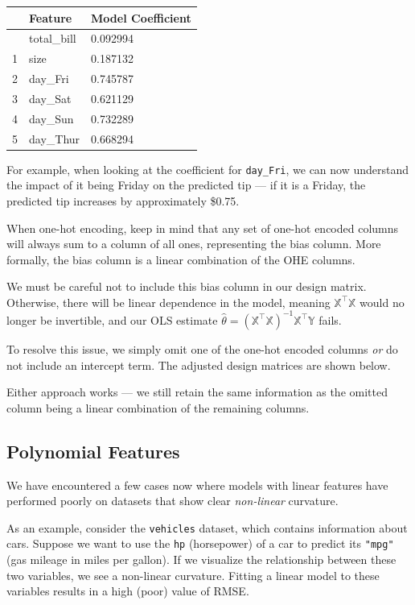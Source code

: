 \documentclass[
  letterpaper,
  DIV=11,
  numbers=noendperiod]{scrreprt}
\begin{document}
\begin{longtable}[]{@{}lll@{}}
\toprule\noalign{}
& Feature & Model Coefficient \\
\midrule\noalign{}
\endhead
\bottomrule\noalign{}
\endlastfoot
0 & total\_bill & 0.092994 \\
1 & size & 0.187132 \\
2 & day\_Fri & 0.745787 \\
3 & day\_Sat & 0.621129 \\
4 & day\_Sun & 0.732289 \\
5 & day\_Thur & 0.668294 \\
\end{longtable}

For example, when looking at the coefficient for \texttt{day\_Fri}, we
can now understand the impact of it being Friday on the predicted tip
--- if it is a Friday, the predicted tip increases by approximately
\$0.75.

When one-hot encoding, keep in mind that any set of one-hot encoded
columns will always sum to a column of all ones, representing the bias
column. More formally, the bias column is a linear combination of the
OHE columns.

We must be careful not to include this bias column in our design matrix.
Otherwise, there will be linear dependence in the model, meaning
\(\mathbb{X}^{\top}\mathbb{X}\) would no longer be invertible, and our
OLS estimate
\(\hat{\theta} = (\mathbb{X}^{\top}\mathbb{X})^{-1}\mathbb{X}^{\top}\mathbb{Y}\)
fails.

To resolve this issue, we simply omit one of the one-hot encoded columns
\emph{or} do not include an intercept term. The adjusted design matrices
are shown below.

Either approach works --- we still retain the same information as the
omitted column being a linear combination of the remaining columns.

\subsection{Polynomial Features}\label{polynomial-features}

We have encountered a few cases now where models with linear features
have performed poorly on datasets that show clear \emph{non-linear}
curvature.

As an example, consider the \texttt{vehicles} dataset, which contains
information about cars. Suppose we want to use the \texttt{hp}
(horsepower) of a car to predict its \texttt{"mpg"} (gas mileage in
miles per gallon). If we visualize the relationship between these two
variables, we see a non-linear curvature. Fitting a linear model to
these variables results in a high (poor) value of RMSE.
\end{document}

